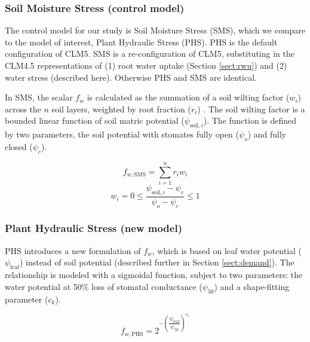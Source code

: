 \documentclass[draft,linenumbers]{agujournal}
\begin{document}
    \subsubsection{Soil Moisture Stress (control model)}
    
    The control model for our study is Soil Moisture Stress (SMS), which we compare to the model of interest, Plant Hydraulic Stress (PHS). 
    PHS is the default configuration of CLM5.
    SMS is a re-configuration of CLM5, substituting in the CLM4.5 representations of 
    (1) root water uptake (Section \ref{sect:rwu}) and (2) water stress (described here).
    Otherwise PHS and SMS are identical.
    
    In SMS, the scalar $f_w$ is calculated as the summation of a soil wilting factor ($w_i$) across the $n$ soil layers, weighted by root fraction ($r_i$) \citep{oleson2013}.
    The soil wilting factor is a bounded linear function of soil matric potential ($\psi_{\text{soil},i}$).
    The function is defined by two parameters, the soil potential with stomates fully open ($\psi_o$) and fully closed ($\psi_c$).  

    \begin{linenomath*}
    \begin{equation}
     f_{w,\text{SMS}} = \sum_{i=1}^{n}{r_iw_i}
    \label{bt:1}
    \end{equation}
    \begin{equation} 
    \label{bt:2}
    w_i=0 \leq \dfrac{\psi_{\text{soil},i}-\psi_{c}}{\psi_{o}-\psi_{c}} \leq 1
    \end{equation}
    \end{linenomath*}
    
    \subsubsection{Plant Hydraulic Stress (new model)}
    
    PHS introduces a new formulation of $f_w$, which is based on leaf water potential ($\psi_{\text{leaf}}$) instead of soil potential (described further in Section \ref{sect:demand}).
    The relationship is modeled with a sigmoidal function, subject to two parameters: the water potential at 50\% loss of stomatal conductance ($\psi_{50}$) and a shape-fitting parameter ($c_k$).
    
    \begin{linenomath*}
    \begin{equation}
    f_{w,\text{PHS}} = 2^{-\left(\dfrac{\psi_{\text{leaf}}}{\psi_{50}}\right)^{c_k}}
    \end{equation}
    \end{linenomath*}
    
\end{document}
